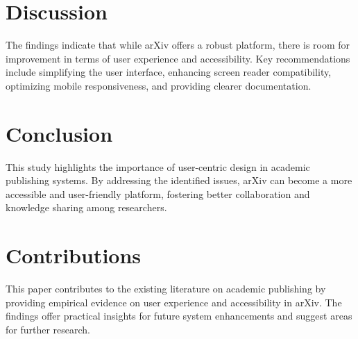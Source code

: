 \documentclass{article}
\begin{document}
\section{Discussion}
The findings indicate that while arXiv offers a robust platform, there is room for improvement in terms of user experience and accessibility. Key recommendations include simplifying the user interface, enhancing screen reader compatibility, optimizing mobile responsiveness, and providing clearer documentation.

\section{Conclusion}
This study highlights the importance of user-centric design in academic publishing systems. By addressing the identified issues, arXiv can become a more accessible and user-friendly platform, fostering better collaboration and knowledge sharing among researchers.

\section{Contributions}
This paper contributes to the existing literature on academic publishing by providing empirical evidence on user experience and accessibility in arXiv. The findings offer practical insights for future system enhancements and suggest areas for further research.
\end{document}
